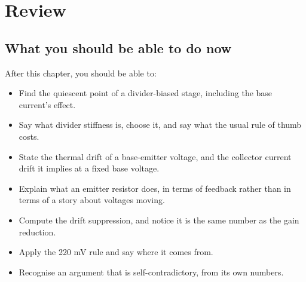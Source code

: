 

\section{Review}
\label{c6:sec:review}

\subsection*{What you should be able to do now}
After this chapter, you should be able to:
\begin{itemize}
  \item Find the quiescent point of a divider-biased stage, including the base current's effect.
  \item Say what divider stiffness is, choose it, and say what the usual rule of thumb costs.
  \item State the thermal drift of a base-emitter voltage, and the collector current drift it implies at a fixed base voltage.
  \item Explain what an emitter resistor does, in terms of feedback rather than in terms of a story about voltages moving.
  \item Compute the drift suppression, and notice it is the same number as the gain reduction.
  \item Apply the 220 mV rule and say where it comes from.
  \item Recognise an argument that is self-contradictory, from its own numbers.
\end{itemize}

